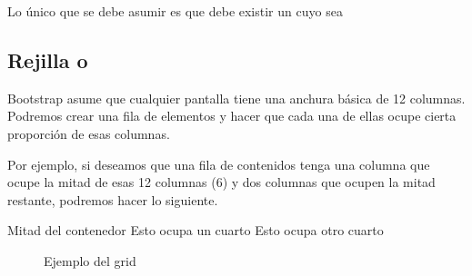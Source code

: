 \documentclass[letterpaper,10pt,spanish]{sphinxmanual}
\begin{document}
Lo único que se debe asumir es que debe existir un  cuyo  sea 


\subsection{Rejilla o }
\label{\detokenize{tema3:rejilla-o-grid}}
Bootstrap asume que cualquier pantalla tiene una anchura básica de 12 columnas. Podremos crear una fila de elementos y hacer que cada una de ellas ocupe cierta proporción de esas columnas.

Por ejemplo, si deseamos que una fila de contenidos tenga una columna que ocupe la mitad de esas 12 columnas (6) y dos columnas que ocupen la mitad restante, podremos hacer lo siguiente.

\begin{sphinxVerbatim}[commandchars=\\\{\}]
     
     
         
            Mitad del contenedor
         
            Esto ocupa un cuarto
         
            Esto ocupa otro  cuarto
\end{sphinxVerbatim}

\begin{figure}[htbp]
\centering
\capstart

\noindent{}
\caption{Ejemplo del grid}\label{\detokenize{tema3:id20}}\end{figure}
\end{document}
